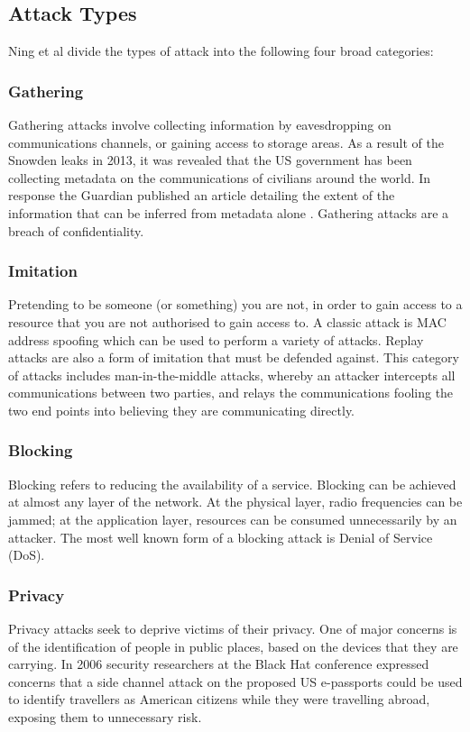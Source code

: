 \documentclass[10pt,journal,compsoc]{IEEEtran}
\begin{document}
\subsection{Attack Types}
Ning et al \cite{Ning2013} divide the types of attack into the following
four broad categories:

\subsubsection{Gathering}
Gathering attacks involve collecting information by eavesdropping on
communications channels, or gaining access to storage areas. As a result of the
Snowden leaks in 2013, it was revealed that the US government has been
collecting metadata on the communications of civilians around the world. In
response the Guardian published an article detailing the extent of the
information that can be inferred from metadata alone \cite{Guardian2013}.
Gathering attacks are a breach of confidentiality. 

\subsubsection{Imitation}
Pretending to be someone (or something) you are not, in order to gain access to
a resource that you are not authorised to gain access to. A classic attack is
MAC address spoofing which can be used to perform a variety of attacks. Replay
attacks are also a form of imitation that must be defended against. This
category of attacks includes man-in-the-middle attacks, whereby an attacker
intercepts all communications between two parties, and relays the
communications fooling the two end points into believing they are communicating
directly. 

\subsubsection{Blocking}
Blocking refers to reducing the availability of a service. Blocking can be
achieved at almost any layer of the network. At the physical layer, radio
frequencies can be jammed; at the application layer, resources can be consumed
unnecessarily by an attacker. The most well known form of a blocking attack is
Denial of Service (DoS). 

\subsubsection{Privacy}
Privacy attacks seek to deprive victims of their privacy. One of major concerns
is of the identification of people in public places, based on the devices that
they are carrying. In 2006 security researchers at the Black Hat conference
\cite{Flexilis2006} expressed concerns that a side channel attack on the
proposed US e-passports could be used to identify travellers as American
citizens while they were travelling abroad, exposing them to unnecessary risk.
\end{document}
